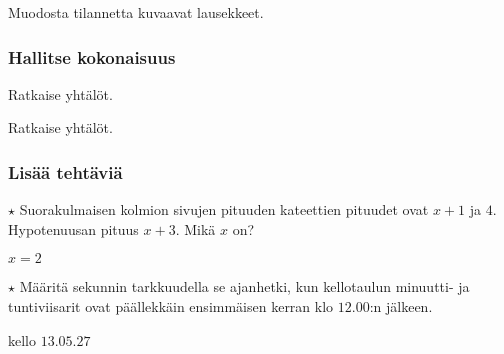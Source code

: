 \begin{tehtavasivu}
\begin{tehtava}
    Muodosta tilannetta kuvaavat lausekkeet.
    \begin{vastaus}
    \end{vastaus}
\end{tehtava}

\subsubsection*{Hallitse kokonaisuus}

\begin{tehtava}
    Ratkaise yhtälöt.
    \begin{vastaus}
    \end{vastaus}
\end{tehtava}

\begin{tehtava}
    Ratkaise yhtälöt.
    \begin{vastaus}
    \end{vastaus}
\end{tehtava}

\subsubsection*{Lisää tehtäviä}

\begin{tehtava}
   $\star$ Suorakulmaisen kolmion sivujen pituuden kateettien pituudet ovat $x+1$ ja $4$. Hypotenuusan pituus $x+3$. Mikä $x$ on?
    \begin{vastaus}
		$x=2$
    \end{vastaus}
\end{tehtava}

\begin{tehtava}
    $\star$ Määritä sekunnin tarkkuudella se ajanhetki, kun kellotaulun minuutti- ja tuntiviisarit ovat päällekkäin ensimmäisen kerran klo $12.00$:n jälkeen.
    \begin{vastaus}
		kello $13.05.27$
    \end{vastaus}
\end{tehtava}

\end{tehtavasivu}